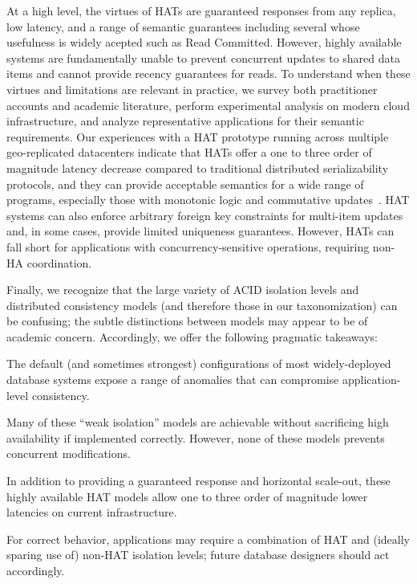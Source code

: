 At a high level, the virtues of HATs are guaranteed responses from any
replica, low latency, and a range of semantic guarantees including
several whose usefulness is widely acepted such as Read
Committed. However, highly available systems are fundamentally unable
to prevent concurrent updates to shared data items and cannot provide
recency guarantees for reads. To understand when these virtues and
limitations are relevant in practice, we survey both practitioner
accounts and academic literature, perform experimental analysis on
modern cloud infrastructure, and analyze representative applications
for their semantic requirements. Our experiences with a HAT prototype
running across multiple geo-replicated datacenters indicate that HATs
offer a one to three order of magnitude latency decrease compared to
traditional distributed serializability protocols, and they can
provide acceptable semantics for a wide range of programs, especially
those with monotonic logic and commutative updates~\cite{calm,
  crdt}. HAT systems can also enforce arbitrary foreign key
constraints for multi-item updates and, in some cases, provide limited
uniqueness guarantees. However, HATs can fall short for applications
with concurrency-sensitive operations, requiring non-HA coordination.

Finally, we recognize that the large variety of ACID isolation levels
and distributed consistency models (and therefore those in our
taxonomization) can be confusing; the subtle distinctions between
models may appear to be of academic concern. Accordingly, we offer the
following pragmatic takeaways:
\begin{introenumerate}
\item The default (and sometimes strongest) configurations of most
  widely-deployed database systems expose a range of anomalies that
  can compromise application-level consistency.

\item Many of these ``weak isolation'' models are achievable without
  sacrificing high availability if implemented correctly. However,
  none of these models prevents concurrent modifications.

\item In addition to providing a guaranteed response and horizontal
  scale-out, these highly available HAT models allow one to three
  order of magnitude lower latencies on current infrastructure.

\item For correct behavior, applications may require a combination of
  HAT and (ideally sparing use of) non-HAT isolation levels; future
  database designers should act accordingly.
\end{introenumerate}


